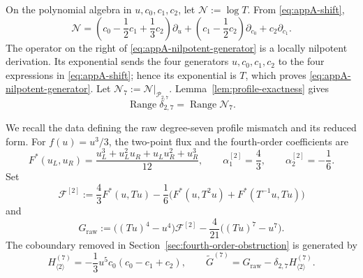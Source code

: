 \documentclass[11pt]{amsart}
\theoremstyle{plain}
\theoremstyle{definition}
\theoremstyle{remark}
\numberwithin{equation}{section}
\theoremstyle{plain}
\begin{document}
On the polynomial algebra in $u,c_0,c_1,c_2$, let
$\mathcal N:=\log T$.  From \eqref{eq:appA-shift},
\begin{equation}\label{eq:appA-nilpotent-generator}
\mathcal N
=\left(c_0-\frac12c_1+\frac13c_2\right)\partial_u
\mathbin{+}\left(c_1-\frac12c_2\right)\partial_{c_0}
+c_2\partial_{c_1}.
\end{equation}
The operator on the right of
\eqref{eq:appA-nilpotent-generator} is a locally nilpotent derivation.  Its
exponential sends the four generators $u,c_0,c_1,c_2$ to the four expressions
in \eqref{eq:appA-shift}; hence its exponential is $T$, which proves
\eqref{eq:appA-nilpotent-generator}.  Let
$\mathcal N_7:=\mathcal N|_{\mathscr P_{2,7}}$.  Lemma~\ref{lem:profile-exactness}
gives
\begin{equation}\label{eq:appA-range-generator}
\operatorname{Range}\delta_{2,7}
=\operatorname{Range}\mathcal N_7.
\end{equation}

We recall the data defining the raw degree-seven profile mismatch and
its reduced form.  For
$f(u)=u^3/3$, the two-point flux and the fourth-order coefficients are
\begin{equation}\label{eq:appA-flux-data}
	F^*(u_L,u_R)
	=\frac{u_L^3+u_L^2u_R+u_Lu_R^2+u_R^3}{12},
	\qquad
	\alpha_1^{[2]}=\frac43,
	\qquad
	\alpha_2^{[2]}=-\frac16.
\end{equation}
Set
\begin{equation}\label{eq:appA-profile-flux}
	\mathcal F^{[2]}
	:=\frac43F^*(u,Tu)
	-\frac16\bigl(F^*(u,T^2u)+F^*(T^{-1}u,Tu)\bigr)
\end{equation}
and
\begin{equation}\label{eq:appA-Graw}
	G_{\mathrm{raw}}
	:=\bigl((Tu)^4-u^4\bigr)\mathcal F^{[2]}
	-\frac4{21}\bigl((Tu)^7-u^7\bigr).
\end{equation}
The coboundary removed in Section~\ref{sec:fourth-order-obstruction} is
generated by
\begin{equation}\label{eq:appA-H2}
	H_{\langle2\rangle}^{(7)}
	=-\frac13u^5c_0(c_0-c_1+c_2),
	\qquad
	\widetilde G^{(7)}
	=G_{\mathrm{raw}}-\delta_{2,7}H_{\langle2\rangle}^{(7)}.
\end{equation}
\end{document}
